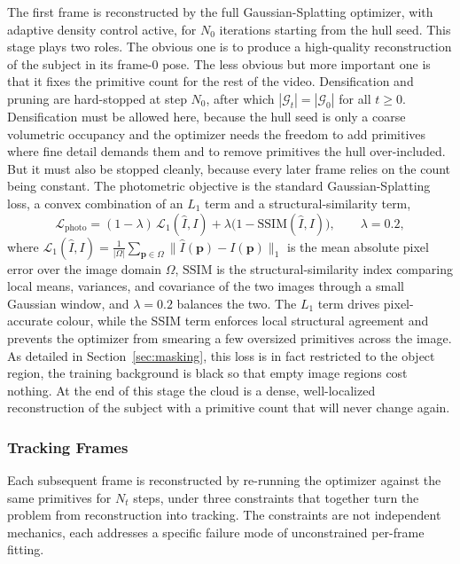 The first frame is reconstructed by the full Gaussian-Splatting optimizer, with
adaptive density control active, for $N_0$ iterations starting from the hull seed.
This stage plays two roles. The obvious one is to produce a high-quality
reconstruction of the subject in its frame-$0$ pose. The less obvious but more
important one is that it fixes the primitive count for the rest of the video.
Densification and pruning are hard-stopped at step $N_0$, after which $|\mathcal{G}_t|
= |\mathcal{G}_0|$ for all $t \ge 0$. Densification must be allowed here, because the
hull seed is only a coarse volumetric occupancy and the optimizer needs the freedom
to add primitives where fine detail demands them and to remove primitives the hull
over-included. But it must also be stopped cleanly, because every later frame relies
on the count being constant. The photometric objective is the standard
Gaussian-Splatting loss, a convex combination of an $L_1$ term and a
structural-similarity term,
\begin{equation}
    \mathcal{L}_{\text{photo}} = (1 - \lambda)\,\mathcal{L}_1(\hat I, I)
    + \lambda \big(1 - \mathrm{SSIM}(\hat I, I)\big), \qquad \lambda = 0.2,
    \label{eq:photo}
\end{equation}
where $\mathcal{L}_1(\hat I, I) = \frac{1}{|\Omega|}\sum_{\mathbf{p}\in\Omega}
\|\hat I(\mathbf{p}) - I(\mathbf{p})\|_1$ is the mean absolute pixel error over the
image domain $\Omega$, $\mathrm{SSIM}$ is the structural-similarity index comparing
local means, variances, and covariance of the two images through a small Gaussian
window, and $\lambda = 0.2$ balances the two. The $L_1$ term drives pixel-accurate
colour, while the SSIM term enforces local structural agreement and prevents the
optimizer from smearing a few oversized primitives across the image. As detailed in
Section~\ref{sec:masking}, this loss is in fact restricted to the object region, the
training background is black so that empty image regions cost nothing. At the end of
this stage the cloud is a dense, well-localized reconstruction of the subject with a
primitive count that will never change again.

\subsubsection{Tracking Frames}
\label{sec:tracking}

Each subsequent frame is reconstructed by re-running the optimizer against the
same primitives for $N_t$ steps, under three constraints that together turn the
problem from reconstruction into tracking. The constraints are not independent
mechanics, each addresses a specific failure mode of unconstrained per-frame
fitting.

